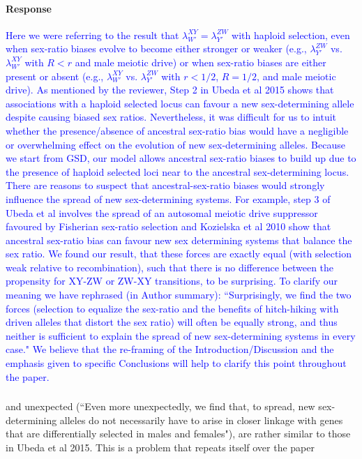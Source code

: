 \documentclass[10pt,letterpaper]{article}
\begin{document}
\noindent\paragraph{Response}
\textcolor{blue}{
Here we were referring to the result that $\lambda_{W'}^{XY} = \lambda_{Y'}^{ZW}$ with haploid selection, even when sex-ratio biases evolve to become either stronger or weaker (e.g., $\lambda_{Y'}^{ZW}$ vs. $\lambda_{W'}^{XY}$ with $R<r$ and male meiotic drive) or when sex-ratio biases are either present or absent (e.g., $\lambda_{W'}^{XY}$ vs. $\lambda_{Y'}^{ZW}$ with $r<1/2$, $R=1/2$, and male meiotic drive).  
As mentioned by the reviewer, Step 2 in Ubeda et al 2015 shows that associations with a haploid selected locus can favour a new sex-determining allele despite causing biased sex ratios. 
Nevertheless, it was difficult for us to intuit whether the presence/absence of ancestral sex-ratio bias would have a negligible or overwhelming effect on the evolution of new sex-determining alleles. 
Because we start from GSD, our model allows ancestral sex-ratio biases to build up due to the presence of haploid selected loci near to the ancestral sex-determining locus. 
There are reasons to suspect that ancestral-sex-ratio biases would strongly influence the spread of new sex-determining systems.
For example, step 3 of Ubeda et al involves the spread of an autosomal meiotic drive suppressor favoured by Fisherian sex-ratio selection and Kozielska et al 2010 show that ancestral sex-ratio bias can favour new sex determining systems that balance the sex ratio.
We found our result, that these forces are exactly equal (with selection weak relative to recombination), such that there is no difference between the propensity for XY-ZW or ZW-XY transitions, to be surprising.
To clarify our meaning we have rephrased (in Author summary): ``Surprisingly, we find the two forces (selection to equalize the sex-ratio and the benefits of hitch-hiking with driven alleles that distort the sex ratio) will often be equally strong, and thus neither is sufficient to explain the spread of new sex-determining systems in every case." 
We believe that the re-framing of the Introduction/Discussion and the emphasis given to specific Conclusions will help to clarify this point throughout the paper.
}

\noindent\subsubsection{}
\noindent and unexpected (``Even more unexpectedly, we find that, to spread, new sex-determining alleles do not necessarily have to arise in closer linkage with genes that are differentially selected in males and females"), are rather similar to those in Ubeda et al 2015. This is a problem that repeats itself over the paper 
\end{document}
